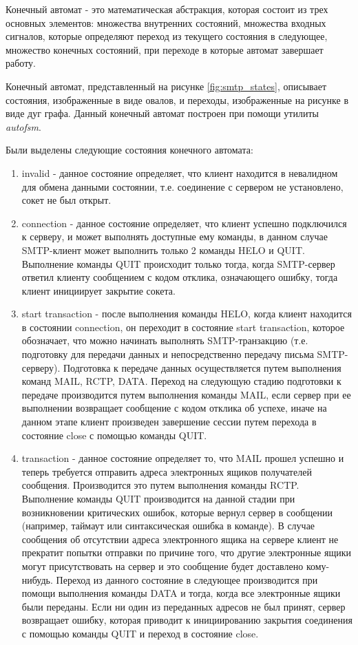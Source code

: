 \documentclass[a4paper,12pt]{report}
\begin{document}
	Конечный автомат - это математическая абстракция, которая состоит из трех основных элементов: множества внутренних состояний, множества входных сигналов, которые определяют переход из текущего состояния в следующее, множество конечных состояний, при переходе в которые автомат завершает работу.

	Конечный автомат, представленный на рисунке \ref{fig:smtp_states}, описывает состояния, изображенные в виде овалов, и переходы, изображенные на рисунке в виде дуг графа. Данный конечный автомат построен при помощи утилиты \textit{autofsm}.

	Были выделены следующие состояния конечного автомата:
	\begin{enumerate}
		\item invalid - данное состояние определяет, что клиент находится в невалидном для обмена данными состоянии, т.е. соединение с сервером не установлено, сокет не был открыт.
		\item connection - данное состояние определяет, что клиент успешно подключился к серверу, и может выполнять доступные ему команды, в данном случае SMTP-клиент может выполнить только 2 команды HELO и QUIT. Выполнение команды QUIT происходит только тогда, когда SMTP-сервер ответил клиенту сообщением с кодом отклика, означающего ошибку, тогда клиент инициирует закрытие сокета.
		\item start transaction - после выполнения команды HELO, когда клиент находится в состоянии connection, он переходит в состояние start transaction, которое обозначает, что можно начинать выполнять SMTP-транзакцию (т.е. подготовку для передачи данных и непосредственно передачу письма SMTP-серверу). Подготовка к передаче данных осуществляется путем выполнения команд MAIL, RCTP, DATA. Переход на следующую стадию подготовки к передаче производится путем выполнения команды MAIL, если сервер при ее выполнении возвращает сообщение с кодом отклика об успехе, иначе на данном этапе клиент произведен завершение сессии путем перехода в состояние close с помощью команды QUIT.
		\item transaction - данное состояние определяет то, что MAIL прошел успешно и теперь требуется отправить адреса электронных ящиков получателей сообщения. Производится это путем выполнения команды RCTP. Выполнение команды QUIT производится на данной стадии при возникновении критических ошибок, которые вернул сервер в сообщении (например, таймаут или синтаксическая ошибка в команде). В случае сообщения об отсутствии адреса электронного ящика на сервере клиент не прекратит попытки отправки по причине того, что другие электронные ящики могут присутствовать на сервер и это сообщение будет доставлено кому-нибудь. Переход из данного состояние в следующее производится при помощи выполнения команды DATA и тогда, когда все электронные ящики были переданы. Если ни один из переданных адресов не был принят, сервер возвращает ошибку, которая приводит к инициированию закрытия соединения с помощью команды QUIT и переход в состояние close.

\end{enumerate}
\end{document}
